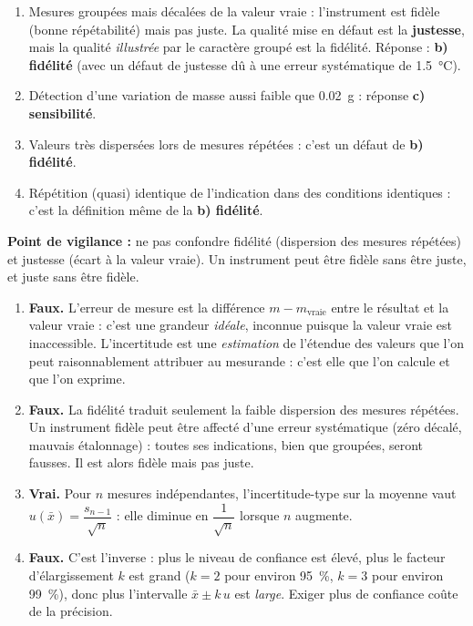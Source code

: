 \documentclass[11pt]{article}
\newcommand{\cle}[1]{{\popxbold\color{popdark}#1}}
\begin{document}
\begin{corrige}
\begin{enumerate}
\item Mesures \cle{groupées} mais \cle{décalées} de la valeur vraie : l'instrument est fidèle (bonne répétabilité) mais pas juste. La qualité mise en défaut est la \textbf{justesse}, mais la qualité \emph{illustrée} par le caractère groupé est la fidélité. Réponse : \textbf{b) fidélité} (avec un défaut de justesse dû à une erreur systématique de \SI{+1,5}{\celsius}).
\item Détection d'une variation de masse aussi faible que \SI{0,02}{g} : réponse \textbf{c) sensibilité}.
\item Valeurs très dispersées lors de mesures répétées : c'est un défaut de \textbf{b) fidélité}.
\item Répétition (quasi) identique de l'indication dans des conditions identiques : c'est la définition même de la \textbf{b) fidélité}.
\end{enumerate}
\textbf{Point de vigilance :} ne pas confondre fidélité (dispersion des mesures répétées) et justesse (écart à la valeur vraie). Un instrument peut être fidèle sans être juste, et juste sans être fidèle.
\end{corrige}

\begin{corrige}
\begin{enumerate}
\item \textbf{Faux.} L'\cle{erreur} de mesure est la différence $m - m_{\text{vraie}}$ entre le résultat et la valeur vraie : c'est une grandeur \emph{idéale}, inconnue puisque la valeur vraie est inaccessible. L'\cle{incertitude} est une \emph{estimation} de l'étendue des valeurs que l'on peut raisonnablement attribuer au mesurande : c'est elle que l'on calcule et que l'on exprime.
\item \textbf{Faux.} La fidélité traduit seulement la faible dispersion des mesures répétées. Un instrument fidèle peut être affecté d'une erreur systématique (zéro décalé, mauvais étalonnage) : toutes ses indications, bien que groupées, seront fausses. Il est alors fidèle mais pas juste.
\item \textbf{Vrai.} Pour $n$ mesures indépendantes, l'incertitude-type sur la moyenne vaut $u(\bar{x}) = \dfrac{s_{n-1}}{\sqrt{n}}$ : elle diminue en $\dfrac{1}{\sqrt{n}}$ lorsque $n$ augmente.
\item \textbf{Faux.} C'est l'inverse : plus le niveau de confiance est élevé, plus le facteur d'élargissement $k$ est grand ($k = 2$ pour environ \SI{95}{\%}, $k = 3$ pour environ \SI{99}{\%}), donc plus l'intervalle $\bar{x} \pm k\,u$ est \emph{large}. Exiger plus de confiance coûte de la précision.
\end{enumerate}
\end{corrige}
\end{document}
